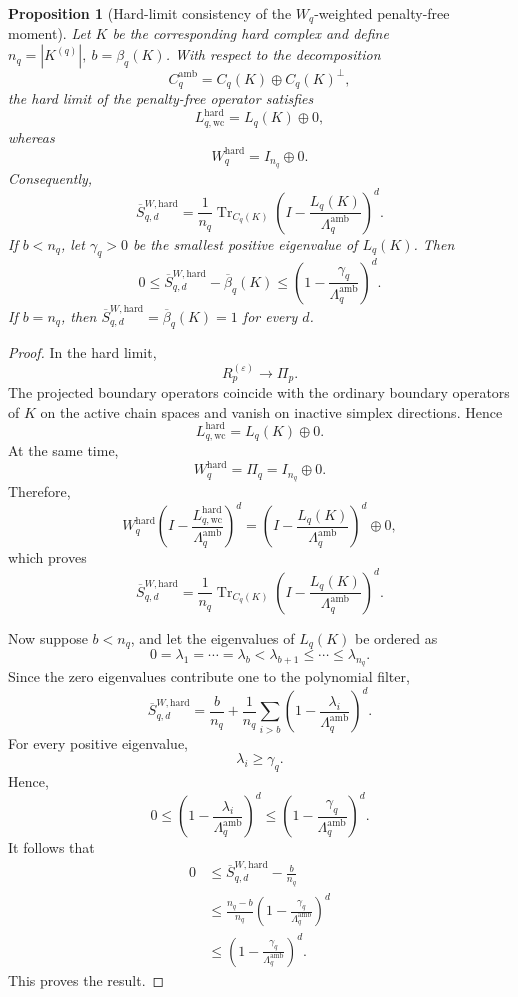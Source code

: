 \documentclass[pdflatex,sn-mathphys-num]{sn-jnl}%
\theoremstyle{thmstyleone}%
\newtheorem{proposition}[theorem]{Proposition}%
\theoremstyle{thmstyletwo}%
\theoremstyle{thmstylethree}%
\begin{document}
\begin{proposition}[Hard-limit consistency of the \(W_q\)-weighted penalty-free moment]
Let \(K\) be the corresponding hard complex and define 
$n_q
=
|K^{(q)}|,
~
b
=
\beta_q(K)$.
With respect to the decomposition
\[
C_q^{\mathrm{amb}}
=
C_q(K)
\oplus
C_q(K)^\perp,
\]
the hard limit of the penalty-free operator satisfies
\[
L_{q,\mathrm{wc}}^{\mathrm{hard}}
=
L_q(K)
\oplus
0,
\]
whereas
\[
W_q^{\mathrm{hard}}
=
I_{n_q}
\oplus
0.
\]
Consequently,
\[
\overline S_{q,d}^{W,\mathrm{hard}}
=
\frac{1}{n_q}
\operatorname{Tr}_{C_q(K)}
\left(
I-
\frac{
L_q(K)
}{
\Lambda_q^{\mathrm{amb}}
}
\right)^d.
\]
If \(b<n_q\), let \(\gamma_q>0\) be the smallest positive eigenvalue of \(L_q(K)\). Then
\[
0
\le
\overline S_{q,d}^{W,\mathrm{hard}}
-
\overline\beta_q(K)
\le
\left(
1-
\frac{
\gamma_q
}{
\Lambda_q^{\mathrm{amb}}
}
\right)^d.
\]
If \(b=n_q\), then
$\overline S_{q,d}^{W,\mathrm{hard}}
=
\overline\beta_q(K)
=
1$
for every \(d\).
\end{proposition}

\begin{proof}
In the hard limit,
\[
R_p^{(\varepsilon)}
\longrightarrow
\Pi_p.
\]
The projected boundary operators coincide with the ordinary boundary operators of \(K\) on the active chain spaces and vanish on inactive simplex directions. Hence
\[
L_{q,\mathrm{wc}}^{\mathrm{hard}}
=
L_q(K)\oplus 0.
\]
At the same time,
\[
W_q^{\mathrm{hard}}
=
\Pi_q
=
I_{n_q}\oplus 0.
\]
Therefore,
\[
W_q^{\mathrm{hard}}
\left(
I-
\frac{
L_{q,\mathrm{wc}}^{\mathrm{hard}}
}{
\Lambda_q^{\mathrm{amb}}
}
\right)^d
=
\left(
I-
\frac{
L_q(K)
}{
\Lambda_q^{\mathrm{amb}}
}
\right)^d
\oplus
0,
\]
which proves
\[
\overline S_{q,d}^{W,\mathrm{hard}}
=
\frac{1}{n_q}
\operatorname{Tr}_{C_q(K)}
\left(
I-
\frac{
L_q(K)
}{
\Lambda_q^{\mathrm{amb}}
}
\right)^d.
\]

Now suppose \(b<n_q\), and let the eigenvalues of \(L_q(K)\) be ordered as
\[
0
=
\lambda_1
=
\cdots
=
\lambda_b
<
\lambda_{b+1}
\le
\cdots
\le
\lambda_{n_q}.
\]
Since the zero eigenvalues contribute one to the polynomial filter,
\[
\overline S_{q,d}^{W,\mathrm{hard}}
=
\frac{b}{n_q}
+
\frac{1}{n_q}
\sum_{i>b}
\left(
1-
\frac{
\lambda_i
}{
\Lambda_q^{\mathrm{amb}}
}
\right)^d.
\]
For every positive eigenvalue,
\[
\lambda_i\ge\gamma_q.
\]
Hence,
\[
0
\le
\left(
1-
\frac{
\lambda_i
}{
\Lambda_q^{\mathrm{amb}}
}
\right)^d
\le
\left(
1-
\frac{
\gamma_q
}{
\Lambda_q^{\mathrm{amb}}
}
\right)^d.
\]
It follows that
\[
\begin{aligned}
0
&\le
\overline S_{q,d}^{W,\mathrm{hard}}
-
\frac{b}{n_q}
\\
&\le
\frac{
n_q-b
}{
n_q
}
\left(
1-
\frac{
\gamma_q
}{
\Lambda_q^{\mathrm{amb}}
}
\right)^d
\\
&\le
\left(
1-
\frac{
\gamma_q
}{
\Lambda_q^{\mathrm{amb}}
}
\right)^d.
\end{aligned}
\]
This proves the result.
\end{proof}
\end{document}
